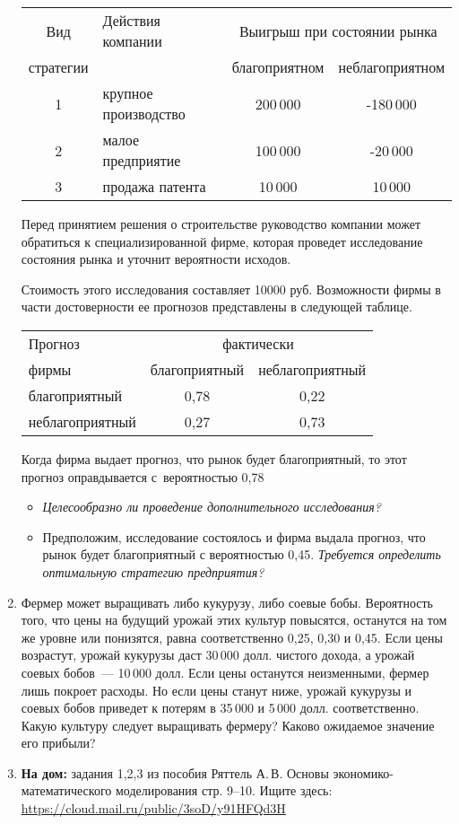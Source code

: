 \documentclass[a4paper,12pt]{extarticle}
\begin{document}
\begin{enumerate}
{\centering \begin{tabular}{|c|l|c|c|}
	\hline
	Вид  & Действия компании & \multicolumn{2}{c|}{Выигрыш при состоянии рынка}\\
	стратегии & & благоприятном & неблагоприятном\\
	\hline
	1 & крупное производство  & 200\,000  & -180\,000\\
	\hline
	2 & малое предприятие  & 100\,000 &  -20\,000\\
	\hline
	3 & продажа патента &  10\,000 &  10\,000\\
	\hline
\end{tabular}\par}

Перед принятием решения о строительстве руководство компании может
обратиться к специализированной фирме, которая проведет исследование состояния рынка и уточнит вероятности исходов. 

Стоимость этого исследования составляет 10000 руб. 
Возможности фирмы в части достоверности ее прогнозов представлены в следующей таблице.

{\centering
\begin{tabular}{|l|c|c|}
\hline 
Прогноз  & \multicolumn{2}{c|}{фактически} \\
 фирмы& благоприятный & неблагоприятный\\
\hline 
благоприятный & 0,78 & 0,22 \\
\hline 
неблагоприятный & 0,27 & 0,73 \\
\hline 
\end{tabular}\par}

Когда фирма выдает прогноз, что рынок будет благоприятный, то этот прогноз оправдывается с~вероятностью 0,78

\begin{itemize}
\item \textit{Целесообразно ли проведение дополнительного исследования?}

\item Предположим, исследование состоялось и фирма выдала прогноз, что рынок будет благоприятный с вероятностью 0,45. \textit{Требуется определить оптимальную стратегию предприятия?}
\end{itemize}

\item Фермер может выращивать либо кукурузу, либо соевые бобы. Вероятность того, что цены на будущий урожай этих культур повысятся, останутся на том же уровне или понизятся, равна соответственно 0,25, 0,30 и 0,45. Если цены возрастут, урожай кукурузы даст 30\,000 долл. чистого дохода, а урожай соевых бобов~--- 10\,000 долл. Если цены останутся неизменными, фермер лишь покроет расходы. Но если цены станут ниже, урожай кукурузы и соевых бобов приведет к потерям в 35\,000 и 5\,000 долл. соответственно. Какую культуру следует выращивать фермеру? Каково ожидаемое значение его прибыли? 

\item \textbf{На дом:} задания 1,2,3 из пособия Ряттель А.\,В. Основы экономико-математического
моделирования стр. 9--10. Ищите здесь: \url{https://cloud.mail.ru/public/3soD/y91HFQd3H}

\end{enumerate}
\end{document}
